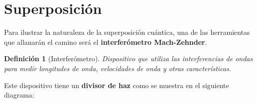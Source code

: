 \documentclass{article}
\newtheorem*{inter*}{Definición}
\begin{document}
\section*{Superposición}
Para ilustrar la naturaleza de la superposición cuántica, una de las herramientas que allanarán el camino será el \textbf{interferómetro Mach-Zehnder}.
\begin{inter*}[Interferómetro]
    Dispositivo que utiliza las interferencias de ondas para medir longitudes de onda, velocidades de onda y otras características.
\end{inter*}
Este dispositivo tiene un \textbf{divisor de haz} como se muestra en el siguiente diagrama:



\end{document}
